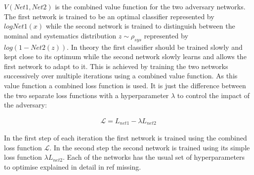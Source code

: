 $V(Net1, Net2)$ is the combined value function for the two adversary networks. The first network is trained to be an optimal classifier represented by $log Net1(\mathit{x})$ while the second network is trained to distinguish between the nominal and systematics distribution $\mathit{z} \sim \rho_{sys}$ represented by $log (1 - Net2(\mathit{z}))$. In theory the first classifier should be trained slowly and kept close to its optimum while the second network slowly learns and allows the first network to adapt to it. This is achieved by training the two networks successively over multiple iterations using a combined value function.
As this value function a combined loss function is used. It is just the difference between the two separate loss functions with a hyperparameter $\lambda$ to control the impact of the adversary:

\begin{align}
    \mathcal{L} = L_{net1} - \lambda L_{net2}
    \label{eq:adversarial_loss}
\end{align}

In the first step of each iteration the first network is trained using the combined loss function $\mathcal{L}$. In the second step the second network is trained using its simple loss function $\lambda L_{net2}$. Each of the networks has the usual set of hyperparameters to optimise explained in detail in ref missing.


